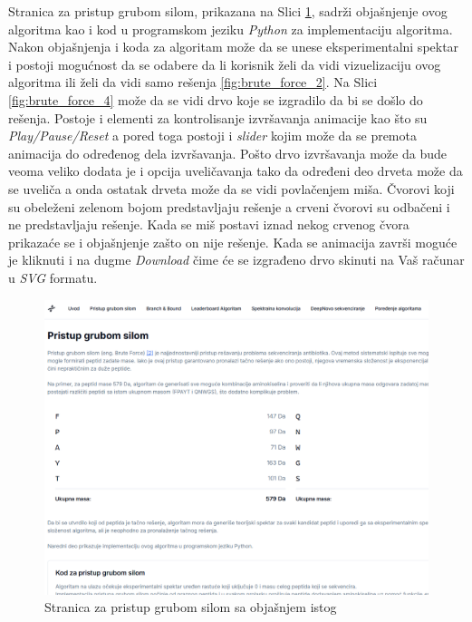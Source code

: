 \documentclass[12pt,oneside]{memoir}
\begin{document}
Stranica za pristup grubom silom, prikazana na Slici \ref{fig:brute_force_1}, sadrži objašnjenje ovog algoritma kao i kod u programskom jeziku \emph{Python} za implementaciju algoritma.
Nakon objašnjenja i koda za algoritam može da se unese eksperimentalni spektar i postoji mogućnost da se odabere da li korisnik želi da vidi vizuelizaciju ovog algoritma ili želi da vidi samo rešenja \ref{fig:brute_force_2}. Na Slici \ref{fig:brute_force_4} može da se vidi drvo koje se izgradilo da bi se došlo do rešenja. Postoje i elementi za kontrolisanje izvršavanja animacije kao što su \emph{Play/Pause/Reset} a pored toga postoji i \emph{slider} kojim može da se premota animacija do određenog dela izvršavanja. Pošto drvo izvršavanja može da bude veoma veliko dodata je i opcija uveličavanja tako da određeni deo drveta može da se uveliča a onda ostatak drveta može da se vidi povlačenjem miša. Čvorovi koji su obeleženi zelenom bojom predstavljaju rešenje a crveni čvorovi su odbačeni i ne predstavljaju rešenje. Kada se miš postavi iznad nekog crvenog čvora prikazaće se i objašnjenje zašto on nije rešenje.
Kada se animacija završi moguće je kliknuti i na dugme \emph{Download} čime će se izgrađeno drvo skinuti na Vaš računar u \emph{SVG} formatu.
\begin{figure}[h]
\centering
\includegraphics[width=1\textwidth]{images/brute_force_1.png}
\caption{Stranica za pristup grubom silom sa objašnjem istog}
\label{fig:brute_force_1}
\end{figure}
\end{document}

